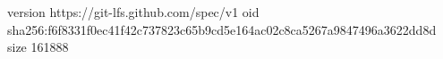 version https://git-lfs.github.com/spec/v1
oid sha256:f6f8331f0ec41f42c737823c65b9cd5e164ac02c8ca5267a9847496a3622dd8d
size 161888
